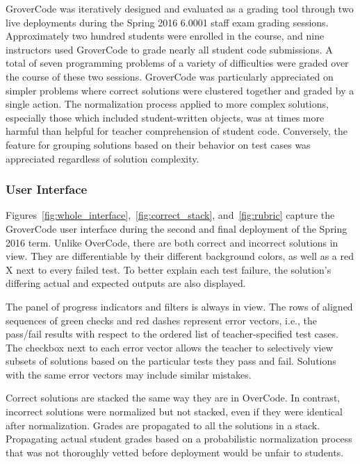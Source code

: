 GroverCode was iteratively designed and evaluated as a grading tool through two live deployments during the Spring 2016 6.0001 staff exam grading sessions. Approximately two hundred students were enrolled in the course, and nine instructors used GroverCode to grade nearly all student code submissions. A total of seven programming problems of a variety of difficulties were graded over the course of these two sessions. GroverCode was particularly appreciated on simpler problems where correct solutions were clustered together and graded by a single action. The normalization process applied to more complex solutions, especially those which included student-written objects, was at times more harmful than helpful for teacher comprehension of student code. Conversely, the feature for grouping solutions based on their behavior on test cases was appreciated regardless of solution complexity.

\subsubsection{User Interface}

Figures~\ref{fig:whole_interface},~\ref{fig:correct_stack}, and~\ref{fig:rubric} capture the GroverCode user interface during the second and final deployment of the Spring 2016 term. Unlike OverCode, there are both correct and incorrect solutions in view. They are differentiable by their different background colors, as well as a red X next to every failed test. To better explain each test failure, the solution's differing actual and expected outputs are also displayed. 

The panel of progress indicators and filters is always in view. The rows of aligned sequences of green checks and red dashes represent error vectors, i.e., the pass/fail results with respect to the ordered list of teacher-specified test cases. The checkbox next to each error vector allows the teacher to selectively view subsets of solutions based on the particular tests they pass and fail. Solutions with the same error vectors may include similar mistakes.

Correct solutions are stacked the same way they are in OverCode. In contrast, incorrect solutions were normalized but not stacked, even if they were identical after normalization. Grades are propagated to all the solutions in a stack. Propagating actual student grades based on a probabilistic normalization process that was not thoroughly vetted before deployment would be unfair to students. 


